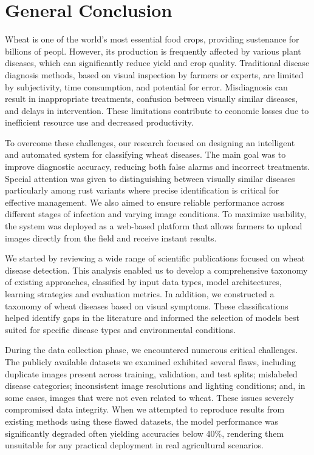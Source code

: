 \chapter*{General Conclusion}

Wheat is one of the world’s most essential food crops, providing sustenance for billions of peopl. However, its production is frequently affected by various plant diseases, which can significantly reduce yield and crop quality. Traditional disease diagnosis methods, based on visual inspection by farmers or experts, are limited by subjectivity, time consumption, and potential for error. Misdiagnosis can result in inappropriate treatments, confusion between visually similar diseases, and delays in intervention. These limitations contribute to economic losses due to inefficient resource use and decreased productivity.


To overcome these challenges, our research focused on designing an intelligent and automated system for classifying wheat diseases. The main goal was to improve diagnostic accuracy, reducing both false alarms and incorrect treatments. Special attention was given to distinguishing between visually similar diseases particularly among rust variants where precise identification is critical for effective management. We also aimed to ensure reliable performance across different stages of infection and varying image conditions. To maximize usability, the system was deployed as a web-based platform that allows farmers to upload images directly from the field and receive instant results. 


We started by reviewing a wide range of scientific publications focused on wheat disease detection. This analysis enabled us to develop a comprehensive taxonomy of existing approaches, classified by input data types, model architectures, learning strategies  and evaluation metrics. In addition, we constructed a taxonomy of wheat diseases based on visual symptoms. These classifications helped identify gaps in the literature and informed the selection of models best suited for specific disease types and environmental conditions.

During the data collection phase, we encountered numerous critical challenges. The publicly available datasets we examined exhibited several flaws, including duplicate images present across training, validation, and test splits; mislabeled disease categories; inconsistent image resolutions and lighting conditions; and, in some cases, images that were not even related to wheat. These issues severely compromised data integrity. When we attempted to reproduce results from existing methods using these flawed datasets, the model performance was significantly degraded often yielding accuracies below 40\%, rendering them unsuitable for any practical deployment in real agricultural scenarios.

